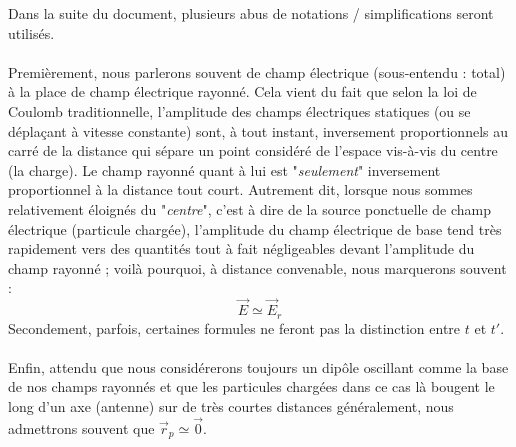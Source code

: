 Dans la suite du document, plusieurs abus de notations / simplifications seront utilisés. \\ \\ Premièrement, nous parlerons souvent de champ électrique (sous-entendu : total) à la place de champ électrique rayonné. Cela vient du fait que selon la loi de Coulomb traditionnelle, l'amplitude des champs électriques statiques (ou se déplaçant à vitesse constante) sont, à tout instant, inversement proportionnels au carré de la distance qui sépare un point considéré de l'espace vis-à-vis du centre (la charge). Le champ rayonné quant à lui est "\textit{seulement}" inversement proportionnel à la distance tout court. Autrement dit, lorsque nous sommes relativement éloignés du "\textit{centre}", c'est à dire de la source ponctuelle de champ électrique (particule chargée), l'amplitude du champ électrique de base tend très rapidement vers des quantités tout à fait négligeables devant l'amplitude du champ rayonné ; voilà pourquoi, à distance convenable, nous marquerons souvent : \[\vec{E} \simeq \vec{E}_{r}\] 
Secondement, parfois, certaines formules ne feront pas la distinction entre $t$ et $t'$. \\\\
Enfin, attendu que nous considérerons toujours un dipôle oscillant comme la base de nos champs rayonnés et que les particules chargées dans ce cas là bougent le long d'un axe (antenne) sur de très courtes distances généralement, nous admettrons souvent que $\vec{r}_{p} \simeq \vec{0}$.

